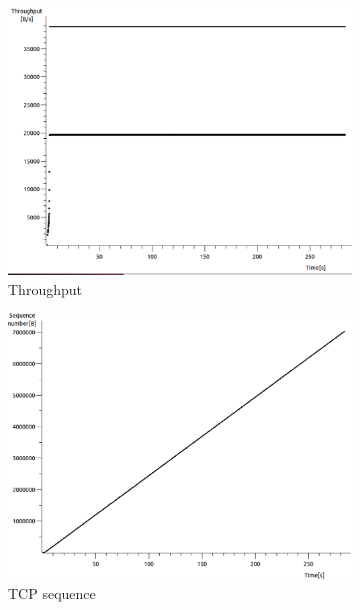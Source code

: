 \documentclass[conference,a4paper]{../../sty/IEEEtran}
\begin{document}
\begin{figure}
 \centering
 \begin{subfigure}[b]{0.2\textwidth}
  \includegraphics[width=\textwidth]{s7-1_th}
  \caption{Throughput}
 \end{subfigure}
 \begin{subfigure}[b]{0.2\textwidth}
  \includegraphics[width=\textwidth]{s7-1_seq}
  \caption{TCP sequence}
 \end{subfigure}
 \begin{subfigure}[b]{0.2\textwidth}

\end{subfigure}
\end{figure}
\end{document}

